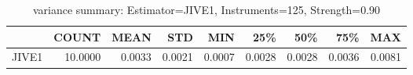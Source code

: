 \begin{table}[ht]
\centering
\caption{variance summary: Estimator=JIVE1, Instruments=125, Strength=0.90}
\begin{tabular}{lrrrrrrrr}
\toprule
 & COUNT & MEAN & STD & MIN & 25\% & 50\% & 75\% & MAX \\
\midrule
JIVE1 & 10.0000 & 0.0033 & 0.0021 & 0.0007 & 0.0028 & 0.0028 & 0.0036 & 0.0081 \\
\bottomrule
\end{tabular}
\end{table}
